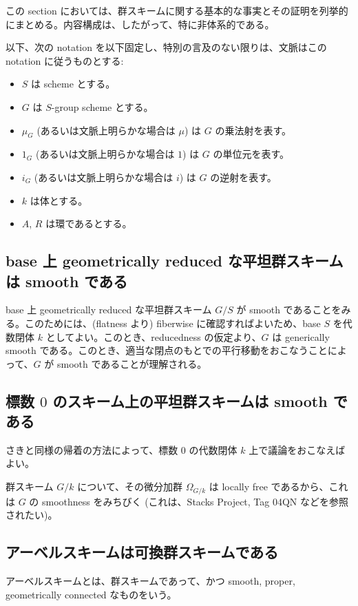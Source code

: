 この section においては、群スキームに関する基本的な事実とその証明を列挙的にまとめる。内容構成は、したがって、特に非体系的である。

以下、次の notation を以下固定し、特別の言及のない限りは、文脈はこの notation に従うものとする:
\begin{itemize}
  \item $S$ は scheme とする。
  \item $G$ は $S$-group scheme とする。
  \item $\mu_G$ (あるいは文脈上明らかな場合は $\mu$) は $G$ の乗法射を表す。
  \item $1_G$ (あるいは文脈上明らかな場合は $1$) は $G$ の単位元を表す。
  \item $i_G$ (あるいは文脈上明らかな場合は $i$) は $G$ の逆射を表す。
  \item $k$ は体とする。
  \item $A$, $R$ は環であるとする。
\end{itemize}

\subsection{base 上 geometrically reduced な平坦群スキームは smooth である}
base 上 geometrically reduced な平坦群スキーム $G / S$ が smooth であることをみる。このためには、(flatness より) fiberwise に確認すればよいため、base $S$ を代数閉体 $k$ としてよい。このとき、reducedness の仮定より、$G$ は generically smooth である。このとき、適当な閉点のもとでの平行移動をおこなうことによって、$G$ が smooth であることが理解される。

\subsection{標数 $0$ のスキーム上の平坦群スキームは smooth である}
さきと同様の帰着の方法によって、標数 $0$ の代数閉体 $k$ 上で議論をおこなえばよい。

群スキーム $G / k$ について、その微分加群 $\Omega_{G / k}$ は locally free であるから、これは $G$ の smoothness をみちびく (これは、Stacks Project, Tag 04QN などを参照されたい)。

\subsection{アーベルスキームは可換群スキームである}
\begin{defn}
  アーベルスキームとは、群スキームであって、かつ smooth, proper, geometrically connected なものをいう。
\end{defn}

